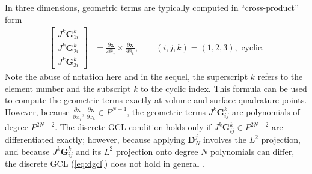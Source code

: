\documentclass[preprint,10pt]{article}
\theoremstyle{definition}
\theoremstyle{lemma}
\theoremstyle{theorem}
\theoremstyle{assumption}
\renewcommand{\hat}{\widehat}
\newcommand{\pd}[2]{\frac{\partial#1}{\partial#2}}
\newcommand{\LRs}[1]{\left[ #1 \right]}
\begin{document}
{In three dimensions, geometric terms are typically computed in ``cross-product'' form
\begin{align}
\LRs{\begin{array}{c}
J^k\bm{G}^k_{1i}\\
J^k\bm{G}^k_{2i}\\
J^k\bm{G}^k_{3i}\end{array}} &= \pd{\bm{x}}{\hat{x}_j}\times \pd{\bm{x}}{\hat{x}_k}, \qquad (i,j,k) = (1,2,3), \text{ cyclic}.
\end{align}
Note the abuse of notation here and in the sequel, the superscript $k$ refers to the element number and the subscript $k$ to the cyclic index. 
This formula can be used to compute the geometric terms exactly at volume and surface quadrature points.  However, because $\pd{\bm{x}}{\hat{x}_j},\pd{\bm{x}}{\hat{x}_k} \in P^{N-1}$, the geometric terms $J^k\bm{G}^k_{ij}$ are polynomials of degree $P^{2N-2}$.  The discrete GCL condition holds only if $J^k\bm{G}^k_{ij} \in P^{2N-2}$ are differentiated exactly; however, because applying $\bm{D}^j_N$ involves the $L^2$ projection, and because $J^k\bm{G}^k_{ij}$ and its $L^2$ projection onto degree $N$ polynomials can differ, the discrete GCL (\ref{eq:dgcl}) does not hold in general \cite{kopriva2006metric}.  

}
\end{document}
